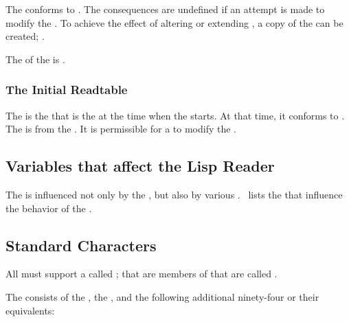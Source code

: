 The  conforms to .
The consequences are undefined if an attempt is made
to modify the .
To achieve the effect of altering or extending ,
a copy of the  can be created; .

The  of the  is .

\subsubsection{The Initial Readtable}

The  is
the  that is the 
at the time when the  starts.
At that time, it conforms to .
The  is  
from the .
It is permissible for a  
to modify the .

\subsection{Variables that affect the Lisp Reader}

The  is influenced not only by the ,
but also by various .  \Thenextfigure\ lists
the  that influence the behavior of the .


\subsection{Standard Characters}

All  must support a  
called ;  that are members of that
 are called .

The   consists of
the   ,
the   ,
and the following additional
ninety-four   or their equivalents:
 
